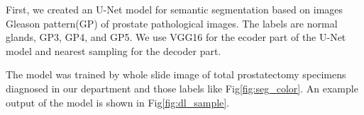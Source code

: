 First, we created an U-Net\cite{unet} model for semantic segmentation based on images Gleason pattern(GP) of prostate pathological images. The labels are normal glands, GP3, GP4, and GP5. We use VGG16\cite{vgg} for the ecoder part of the U-Net model and nearest sampling for the decoder part.\par

\vspace{0.5zh}

The model was trained by whole slide image of total prostatectomy specimens diagnosed in our department and those labels like Fig\ref{fig:seg_color}. An example output of the model is shown in Fig\ref{fig:dl_sample}. \par

\vspace{-1zh}


